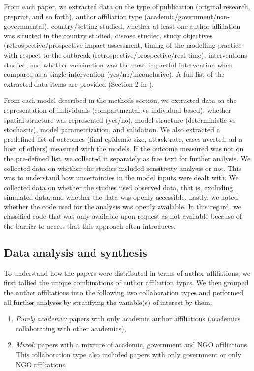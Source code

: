 \documentclass[10pt,letterpaper]{article}
\begin{document}
From each paper, we extracted data on the type of publication (original research, preprint, and so forth), author affiliation type (academic/government/non-governmental), country/setting studied, whether at least one author affiliation was situated in the country studied, disease studied, study objectives (retrospective/prospective impact assessment, timing of the modelling practice with respect to the outbreak (retrospective/prospective/real-time), interventions studied, and whether vaccination was the most impactful intervention when compared as a single intervention (yes/no/inconclusive). A full list of the extracted data items are provided (Section 2 in ).  

From each model described in the methods section, we extracted data on the representation of individuals (compartmental vs individual-based), whether spatial structure was represented (yes/no), model structure (deterministic vs stochastic), model parametrization, and validation. We also extracted a predefined list of outcomes (final epidemic size, attack rate, cases averted, ad a host of others) measured with the models. If the outcome measured was not on the pre-defined list, we collected it separately as free text for further analysis. We collected data on whether the studies included sensitivity analysis or not. This was to understand how uncertainties in the model inputs were dealt with.  We collected data on whether the studies used observed data, that is, excluding simulated data, and whether the data was openly accessible. Lastly, we noted whether the code used for the analysis was openly available. In this regard, we classified code that was only available upon request as not available because of the barrier to access that this approach often introduces.



\subsection*{Data analysis and synthesis}
To understand how the papers were distributed in terms of author affiliations, we first tallied the unique combinations of author affiliation types. We then grouped the author affiliations into the following two collaboration types and performed all further analyses by stratifying the variable(s) of interest by them:

\begin{enumerate}
	\item \textit{Purely academic:} papers with only academic author affiliations (academics collaborating with other academics), 
	\item \textit{Mixed:} papers with a mixture of academic, government and NGO affiliations. This collaboration type also included papers with only government or only NGO affiliations. 
\end{enumerate}
\end{document}
